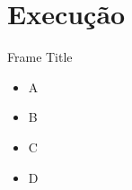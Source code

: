 \section{Execução}

\begin{frame}{Frame Title}
    \begin{itemize}
        \item A
        \item B
        \item C 
        \item D 
    \end{itemize}
\end{frame}
